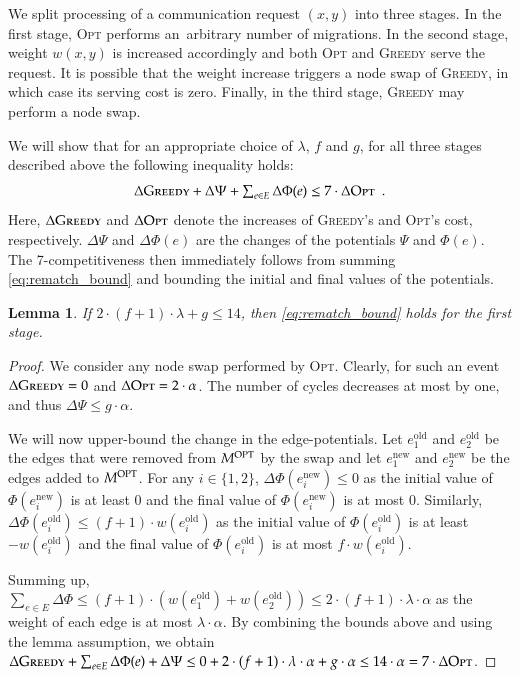 \documentclass[11pt,a4paper]{scrartcl}
\newtheorem{lemma}[theorem]{Lemma}
\newcommand{\GREEDY}{\textsc{Greedy}\xspace}
\newcommand{\MOPT}{M^\textsc{OPT}}
\newcommand{\OPT}{\textsc{Opt}\xspace}
\newcommand{\eold}{e^\textrm{old}}
\newcommand{\enew}{e^\textrm{new}}
\begin{document}
We split processing of a communication request $(x,y)$ into three stages. In
the first stage, \OPT performs an~arbitrary number of migrations. In the
second stage, weight $w(x,y)$ is increased accordingly and both \OPT and
\GREEDY serve the request. It is possible that the weight increase triggers a
node swap of \GREEDY, in which case its serving cost is zero. Finally, in the
third stage, \GREEDY may perform a node swap.

We will show that for an appropriate choice of $\lambda$, $f$ and $g$, for all
three stages described above the following inequality holds:
\begin{equation}
\label{eq:rematch_bound}
	\textstyle \Delta \GREEDY + \Delta \Psi + \sum_{e \in E} \Delta \Phi(e) \leq 7 \cdot \Delta \OPT \enspace.
\end{equation}
Here, $\Delta \GREEDY$ and $\Delta \OPT$ denote the increases of \GREEDY's and
\OPT's cost, respectively. $\Delta \Psi$ and $\Delta \Phi(e)$ are the changes
of the potentials $\Psi$ and $\Phi(e)$. The 7-competitiveness then immediately
follows from summing \eqref{eq:rematch_bound} and bounding the initial and
final values of the potentials. 

\begin{lemma}
\label{lem:opt_swap}
If $2 \cdot (f+1) \cdot \lambda + g \leq 14$, then \eqref{eq:rematch_bound}
holds for the first stage.
\end{lemma}

\begin{proof}
We consider any node swap performed by \OPT. Clearly, for such an event
$\Delta \GREEDY = 0$ and $\Delta \OPT = 2 \cdot \alpha$. The number of cycles
decreases at most by one, and thus $\Delta \Psi \leq g \cdot \alpha$.

We will now upper-bound the change in the edge-potentials. Let $\eold_1$ and
$\eold_2$ be the edges that were removed from $\MOPT$ by the swap and let
$\enew_1$ and $\enew_2$ be the edges added to $\MOPT$. For any $i \in
\{1,2\}$, $\Delta \Phi(\enew_i) \leq 0$ as the initial value of
$\Phi(\enew_i)$ is at least $0$ and the final value of $\Phi(\enew_i)$ is at
most $0$. Similarly, $\Delta \Phi(\eold_i) \leq (f+1) \cdot w(\eold_i)$ as the
initial value of $\Phi(\eold_i)$ is at least $-w(\eold_i)$ and the final value
of $\Phi(\eold_i)$ is at most $f \cdot w(\eold_i)$.

Summing up, $\sum_{e \in E} \Delta \Phi \leq (f+1) \cdot (w(\eold_1) +
w(\eold_2)) \leq 2 \cdot (f+1) \cdot \lambda \cdot \alpha$ as the weight of each edge
is at most $\lambda \cdot \alpha$. By combining the bounds above and using the
lemma assumption, we obtain $\Delta \GREEDY + \sum_{e \in E} \Delta \Phi(e) +
\Delta \Psi \leq 0 + 2 \cdot (f+1) \cdot \lambda \cdot \alpha + g \cdot \alpha 
\leq 14 \cdot \alpha = 7 \cdot \Delta \OPT$.
\end{proof}
\end{document}
